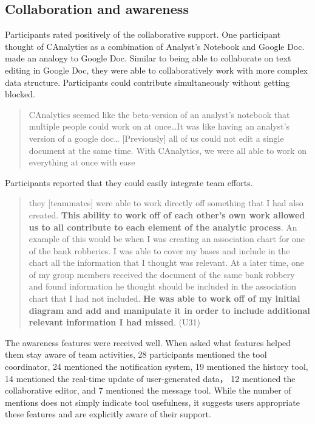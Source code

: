\documentclass[]{article}
\begin{document}
\subsection{Collaboration and
awareness}\label{collaboration-and-awareness}

Participants rated positively of the collaborative support. One
participant thought of CAnalytics as a combination of Analyst's Notebook
and Google Doc. made an analogy to Google Doc. Similar to being able to
collaborate on text editing in Google Doc, they were able to
collaboratively work with more complex data structure. Participants
could contribute simultaneously without getting blocked.

\begin{quote}
CAnalytics seemed like the beta-version of an analyst's notebook that
multiple people could work on at once\ldots{}It was like having an
analyst's version of a google doc\ldots{} {[}Previously{]} all of us
could not edit a single document at the same time. With CAnalytics, we
were all able to work on everything at once with ease
\end{quote}

Participants reported that they could easily integrate team efforts.

\begin{quote}
they {[}teammates{]} were able to work directly off something that I had
also created. \textbf{This ability to work off of each other's own work
allowed us to all contribute to each element of the analytic process}.
An example of this would be when I was creating an association chart for
one of the bank robberies. I was able to cover my bases and include in
the chart all the information that I thought was relevant. At a later
time, one of my group members received the document of the same bank
robbery and found information he thought should be included in the
association chart that I had not included. \textbf{He was able to work
off of my initial diagram and add and manipulate it in order to include
additional relevant information I had missed}. (U31)
\end{quote}

The awareness features were received well. When asked what features
helped them stay aware of team activities, 28 participants mentioned the
tool coordinator, 24 mentioned the notification system, 19 mentioned the
history tool, 14 mentioned the real-time update of user-generated data，
12 mentioned the collaborative editor, and 7 mentioned the message tool.
While the number of mentions does not simply indicate tool usefulness,
it suggests users appropriate these features and are explicitly aware of
their support.
\end{document}
